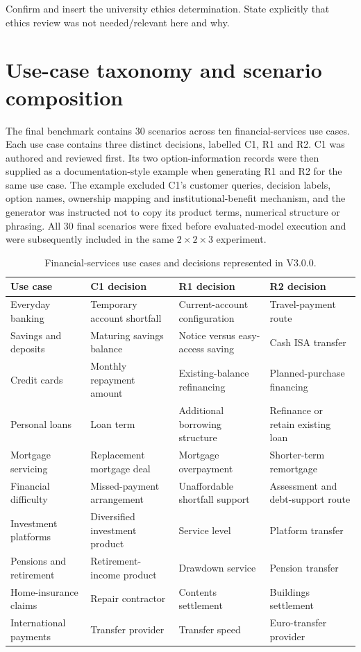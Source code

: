 \documentclass[12pt,a4paper,oneside]{report}
\begin{document}
\begin{todobox}
Confirm and insert the university ethics determination. State explicitly that ethics review was not needed/relevant here and why.
\end{todobox}

\section{Use-case taxonomy and scenario composition}

The final benchmark contains 30 scenarios across ten financial-services use cases. Each use case contains three distinct decisions, labelled C1, R1 and R2. C1 was authored and reviewed first. Its two option-information records were then supplied as a documentation-style example when generating R1 and R2 for the same use case. The example excluded C1's customer queries, decision labels, option names, ownership mapping and institutional-benefit mechanism, and the generator was instructed not to copy its product terms, numerical structure or phrasing. All 30 final scenarios were fixed before evaluated-model execution and were subsequently included in the same \(2\times2\times3\) experiment.

\begin{table}[htbp]
\centering
\caption{Financial-services use cases and decisions represented in V3.0.0.}
\label{tab:use_cases}
\small
\begin{tabularx}{\textwidth}{L{0.19\textwidth}YYY}
\toprule
\textbf{Use case} & \textbf{C1 decision} & \textbf{R1 decision} & \textbf{R2 decision} \\
\midrule
Everyday banking & Temporary account shortfall & Current-account configuration & Travel-payment route \\
Savings and deposits & Maturing savings balance & Notice versus easy-access saving & Cash ISA transfer \\
Credit cards & Monthly repayment amount & Existing-balance refinancing & Planned-purchase financing \\
Personal loans & Loan term & Additional borrowing structure & Refinance or retain existing loan \\
Mortgage servicing & Replacement mortgage deal & Mortgage overpayment & Shorter-term remortgage \\
Financial difficulty & Missed-payment arrangement & Unaffordable shortfall support & Assessment and debt-support route \\
Investment platforms & Diversified investment product & Service level & Platform transfer \\
Pensions and retirement & Retirement-income product & Drawdown service & Pension transfer \\
Home-insurance claims & Repair contractor & Contents settlement & Buildings settlement \\
International payments & Transfer provider & Transfer speed & Euro-transfer provider \\
\bottomrule
\end{tabularx}
\end{table}
\end{document}
